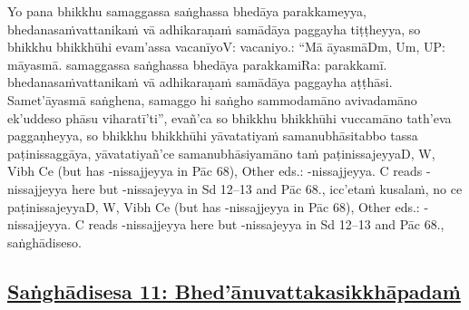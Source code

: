 Yo pana bhikkhu samaggassa saṅghassa bhedāya parakkameyya, bhedanasaṁvattanikaṁ vā adhikaraṇaṁ samādāya paggayha tiṭṭheyya, so bhikkhu bhikkhūhi evam'assa vacanīyo\makeatletter\hyperlink{endnote-appendix}\makeatother V: vacaniyo.: ``Mā āyasmā\makeatletter\hyperlink{endnote-appendix}\makeatother Dm, Um, UP: māyasmā. samaggassa saṅghassa bhedāya parakkami\makeatletter\hyperlink{endnote-appendix}\makeatother Ra: parakkamī. bhedanasaṁvattanikaṁ vā adhikaraṇaṁ samādāya paggayha aṭṭhāsi. Samet'āyasmā saṅghena, samaggo hi saṅgho sammodamāno avivadamāno ek'uddeso phāsu viharatī'ti'', evañ'ca so bhikkhu bhikkhūhi vuccamāno tath'eva paggaṇheyya, so bhikkhu bhikkhūhi yāvatatiyaṁ samanubhāsitabbo tassa paṭinissaggāya, yāvatatiyañ'ce samanubhāsiyamāno taṁ paṭinissajeyya\makeatletter\hyperlink{endnote-appendix}\makeatother D, W, Vibh Ce (but has -nissajjeyya in Pāc 68), Other eds.: -nissajjeyya. C reads -nissajjeyya here but -nissajeyya in Sd 12–13
and Pāc 68., icc'etaṁ kusalaṁ, no ce paṭinissajeyya\makeatletter\hyperlink{endnote-appendix}\makeatother D, W, Vibh Ce (but has -nissajjeyya in Pāc 68), Other eds.: -nissajjeyya. C reads -nissajjeyya here but -nissajeyya in Sd 12–13
and Pāc 68., saṅghādiseso.



\subsection*{\hyperref[comm11]{Saṅghādisesa 11: Bhed'ānuvattakasikkhāpadaṁ}}
\label{sd11}


